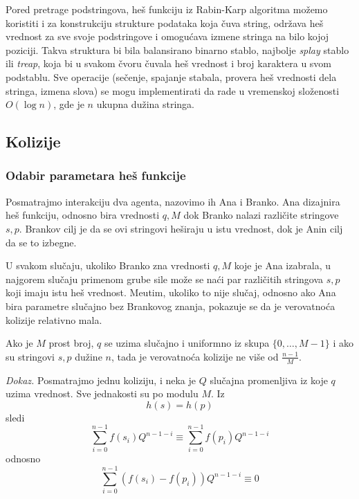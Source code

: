 \noindent
\begin{minipage}[l]{\textwidth}

\end{minipage}

Pored pretrage podstringova, he\v s funkciju iz Rabin-Karp algoritma mo\v zemo koristiti i za konstrukciju strukture podataka koja \v cuva string, odr\v zava he\v s vrednost za sve svoje podstringove i omogu\' cava izmene stringa na bilo kojoj poziciji. Takva struktura bi bila balansirano binarno stablo, najbolje \textit{splay} stablo\cite{splayrad} ili \textit{treap}\cite{treaprad}, koja bi u svakom \v cvoru \v cuvala he\v s vrednost i broj karaktera u svom podstablu. Sve operacije (se\v cenje, spajanje stabala, provera he\v s vrednosti dela stringa, izmena slova) se mogu implementirati da rade u vremenskoj slo\v zenosti $O(\log n)$, gde je $n$ ukupna du\v zina stringa. 

\subsection{Kolizije}

\subsubsection{Odabir parametara he\v s funkcije}

Posmatrajmo interakciju dva agenta, nazovimo ih Ana i Branko. Ana dizajnira he\v s funkciju, odnosno bira vrednosti $q, M$ dok Branko nalazi razli\v cite stringove $s,p$. Brankov cilj je da se ovi stringovi he\v siraju u istu vrednost, dok je Anin cilj da se to izbegne.

U svakom slu\v caju, ukoliko Branko zna vrednosti $q,M$ koje je Ana izabrala, u najgorem slu\v caju primenom grube sile mo\v ze se na\' ci par razli\v citih stringova $s,p$ koji imaju istu he\v s vrednost. Me\dj utim, ukoliko to nije slu\v caj, odnosno ako Ana bira parametre slu\v cajno bez Brankovog znanja, pokazuje se da je verovatno\' ca kolizije relativno mala.

\begin{thm}
    Ako je $M$ prost broj, $q$ se uzima slu\v cajno i uniformno iz skupa $\{0, \ldots, M-1\}$ i ako su stringovi $s,p$ du\v zine $n$, tada je verovatno\' ca kolizije ne vi\v se od $\frac{n-1}{M}$.
\end{thm}

\textit{Dokaz.} Posmatrajmo jednu koliziju, i neka je $Q$ slu\v cajna promenljiva iz koje $q$ uzima vrednost. Sve jednakosti su po modulu $M$. Iz
$$
h(s) = h(p)
$$
sledi
$$
\sum_{i=0}^{n-1}f(s_i)Q^{n-1-i} \equiv  \sum_{i=0}^{n-1}f(p_i)Q^{n-1-i}
$$
odnosno
$$
\sum_{i=0}^{n-1}(f(s_i)-f(p_i))Q^{n-1-i} \equiv 0
$$

